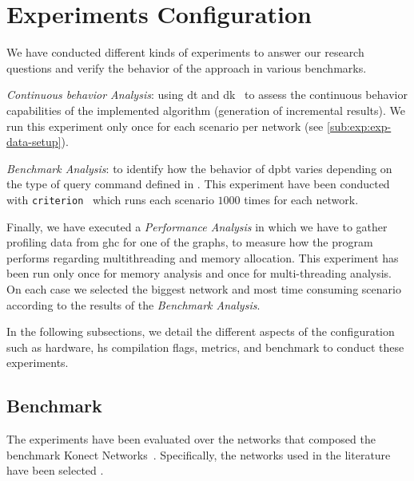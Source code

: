 \section{Experiments Configuration}
We have conducted different kinds of experiments to answer our research questions and verify the behavior of the approach in various benchmarks.
\begin{inparaenum}[\bf i\upshape)]
  \item \emph{Continuous behavior Analysis}: using \acrfull{dt} and \acrfull{dk}~\cite{diefpaper} to assess the continuous behavior capabilities of the implemented algorithm (generation of incremental results). We run this experiment only once for each scenario per network (see \autoref{sub:exp:exp-data-setup}).
  \item \emph{Benchmark Analysis}: to identify how the behavior of \acrshort{dpbt} varies depending on the type of query command defined in . This experiment have been conducted with \texttt{criterion}~\cite{criterion} which runs each scenario $1000$ times for each network.
  \item Finally, we have executed a \textit{Performance Analysis} in which we have to gather profiling data from \acrfull{ghc} for one of the graphs, to measure how the program performs regarding multithreading and memory allocation. This experiment has been run only once for memory analysis and once for multi-threading analysis. On each case we selected the biggest network and most time consuming scenario according to the results of the \emph{Benchmark Analysis}. 
\end{inparaenum}
In the following subsections, we detail the different aspects of the configuration such as hardware, \acrshort{hs} compilation flags, metrics, and benchmark to conduct these experiments.


\subsection{Benchmark}\label{data:set}
The experiments have been evaluated over the networks that composed the benchmark Konect Networks~\cite{konect}. 
Specifically, the networks used in the literature have been selected \cite{konect:2017:dbpedia-recordlabel,konect:2017:moreno_crime,konect:2017:opsahl-ucforum,konect:2017:wang-amazon}.

